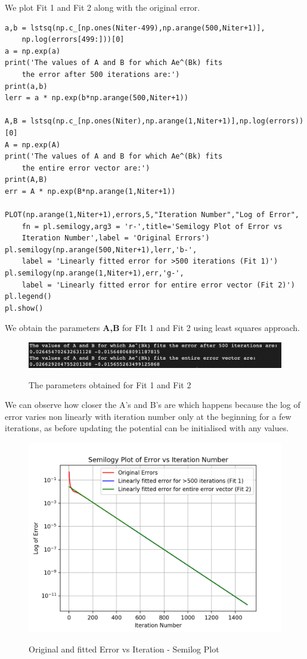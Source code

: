 \documentclass[11pt, a4paper]{article}
\begin{document}
We plot Fit 1 and Fit 2 along with the original error.
\begin{verbatim}
a,b = lstsq(np.c_[np.ones(Niter-499),np.arange(500,Niter+1)],
	np.log(errors[499:]))[0]
a = np.exp(a)
print('The values of A and B for which Ae^(Bk) fits 
	the error after 500 iterations are:')
print(a,b)
lerr = a * np.exp(b*np.arange(500,Niter+1))

A,B = lstsq(np.c_[np.ones(Niter),np.arange(1,Niter+1)],np.log(errors))[0]
A = np.exp(A)
print('The values of A and B for which Ae^(Bk) fits 
	the entire error vector are:')
print(A,B)
err = A * np.exp(B*np.arange(1,Niter+1))

PLOT(np.arange(1,Niter+1),errors,5,"Iteration Number","Log of Error",
	fn = pl.semilogy,arg3 = 'r-',title='Semilogy Plot of Error vs 
	Iteration Number',label = 'Original Errors')
pl.semilogy(np.arange(500,Niter+1),lerr,'b-',
	label = 'Linearly fitted error for >500 iterations (Fit 1)')
pl.semilogy(np.arange(1,Niter+1),err,'g-',
	label = 'Linearly fitted error for entire error vector (Fit 2)')
pl.legend()
pl.show()
\end{verbatim}
We obtain the parameters \textbf{A,B} for FIt 1 and Fit 2 using least squares approach. 
\begin{figure}[H]
   	\centering
   	\includegraphics[scale=0.5]{out1.png}
   	\label{fig:out1}
   	\caption{The parameters obtained for Fit 1 and Fit 2}
\end{figure}
We can observe how closer the A's and B's are which happens because the log of error varies non linearly with iteration number only at the beginning for a few iterations, as before updating the potential can be initialised with any values.

\begin{figure}[H]
   	\centering
   	\includegraphics[scale=0.5]{fitting.png}
   	\label{fig:fitting}
   	\caption{Original and fitted Error vs Iteration - Semilog Plot}
\end{figure}
\end{document}
